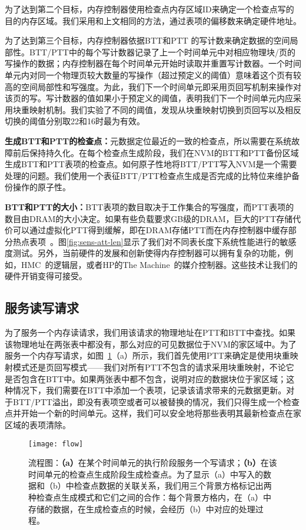 为了达到第二个目标，内存控制器使用检查点内存区域ID来确定一个检查点写的目的内存区域。我们采用和上文相同的方法，通过表项的偏移数来确定硬件地址。 

为了达到第三个目标，内存控制器依据BTT和PTT 的写计数来确定数据的空间局部性。BTT/PTT中的每个写计数器记录了上一个时间单元中对相应物理块/页的写操作的数据；内存控制器在每个时间单元开始时读取并重置写计数器。一个时间单元内对同一个物理页较大数量的写操作（超过预定义的阈值）意味着这个页有较高的空间局部性和写强度。为此，我们下一个时间单元即采用页回写机制来操作对该页的写。写计数器的值如果小于预定义的阈值，表明我们下一个时间单元内应采用块重映射机制。我们实验了不同的阈值，发现从块重映射切换到页回写以及相反切换的阈值分别取22和16时最为有效。
 
\textbf{生成BTT和PTT的检查点：}元数据定位最近的一致的检查点，所以需要在系统故障前后保持持久化。在每个检查点生成阶段，我们在NVM的BTT和PTT备份区域生成BTT和PTT表项的检查点。如何原子性地将BTT/PTT写入NVM是一个需要处理的问题。我们使用一个表征BTT/PTT检查点生成是否完成的比特位来维护备份操作的原子性。 

\textbf{BTT和PTT的大小：}BTT表项的数目取决于工作集合的写强度，而PTT表项的数目由DRAM的大小决定。如果有些负载要求GB级的DRAM，巨大的PTT存储代价可以通过虚拟化PTT得到缓解，即在DRAM存储PTT而在内存控制器中缓存部分热点表项~\cite{Meza2012, Yoon2010, Burcea2008}。图\ref{fig:sens-att-len}显示了我们对不同表长度下系统性能进行的敏感度测试。另外，当前硬件的发展和创新使得内存控制器可以拥有复杂的功能，例如，HMC~\cite{HMC:2011}的逻辑层，或者HP的The Machine~\cite{TheMachine:2015}的媒介控制器。这些技术让我们的硬件开销变得可接受。

\subsection{服务读写请求}

为了服务一个内存读请求，我们用该请求的物理地址在PTT和BTT中查找。如果该物理地址在两张表中都没有，那么对应的可见数据位于NVM的家区域中。为了服务一个内存写请求，如图~\ref{fig:flow}（a）所示，我们首先使用PTT来确定是使用块重映射模式还是页回写模式——我们对所有PTT不包含的请求采用块重映射，不论它是否包含在BTT中。如果两张表中都不包含，说明对应的数据块位于家区域；这种情况下，我们需要在BTT中添加一个表项，记录该请求带来的元数据更新。对于BTT/PTT溢出，即没有表项空或者可以被替换的情况，我们只得生成一个检查点并开始一个新的时间单元。这样，我们可以安全地将那些表明其最新检查点在家区域的表项清除。

\begin{figure}[!h]
\centering
\texttt{[image: flow]}
\caption{流程图：\textbf{（a）}在某个时间单元的执行阶段服务一个写请求；\textbf{（b）}在该时间单元的检查点生成阶段生成检查点。为了显示（a）中写入的数据和（b）中检查点数据的关联关系，我们用三个背景方格标记出两种检查点生成模式和它们之间的合作：每个背景方格内，在（a）中存储的数据，在生成检查点的时候，会经历（b）中对应的处理过程。}
\label{fig:flow}
\end{figure}

